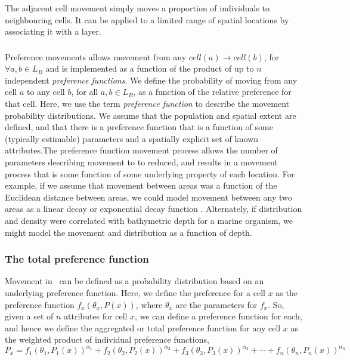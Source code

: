 The adjacent cell movement simply moves a proportion of individuals to neighbouring cells. It can be applied to a limited range of spatial locations by associating it with a layer.

\subsubsection{}

Preference movements allows movement from any $cell(a) \rightarrow cell(b)$, for $\forall a,b \in L_B$ and is implemented as a function of the product of up to $n$ independent \emph{preference functions}. We define the probability of moving from any cell $a$ to any cell $b$, for all $a,b \in L_B$, as a function of the relative preference for that cell. Here, we use the term \emph{preference function} \citep{1366,1367} to describe the movement probability distributions. We assume that the population and spatial extent are defined, and that there is a preference function that is a function of some (typically estimable) parameters and a spatially explicit set of known attributes.The preference function movement process allows the number of parameters describing movement to to reduced, and results in a movement process that is some function of some underlying property of each location. For example, if we assume that movement between areas was a function of the Euclidean distance between areas, we could model movement between any two areas as a linear decay or exponential decay function \citep{1366}. Alternately, if distribution and density were correlated with bathymetric depth for a marine organism, we might model the movement and distribution as a function of depth. 

\subsubsection*{The total preference function}

Movement in \SPM\ can be defined as a probability distribution based on an underlying preference function. Here, we define the preference for a cell $x$ as the preference function $f_x(\theta_x,P(x))$, where $\theta_x$ are the parameters for $f_x$. So, given a set of $n$ attributes for cell $x$, we can define a preference function for each, and hence we define the aggregated or total preference function for any cell $x$ as the weighted product of individual preference functions,
\begin{equation}
  P_x=f_1(\theta_1,P_1(x))^{\alpha_1} + f_2(\theta_2,P_2(x))^{\alpha_2} + f_3(\theta_3,P_3(x))^{\alpha_3} + \cdots + f_n(\theta_n,P_n(x))^{\alpha_n}
\end{equation}

